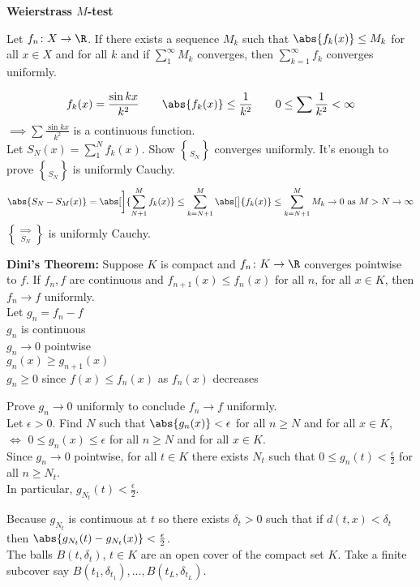 \cor \textbf{Weierstrass $M$-test}

Let $f_n\colon X\to\R$.  If there exists a sequence $M_k$ such that $\abs{f_k(x)}\leq M_k$ for all $x\in X$ and for all $k$ and if $\sum_1^\infty M_k$ converges, then $\sum_{k=1}^\infty f_k$ converges uniformly.

\ex
\[ f_k(x) = \frac{\sin kx}{k^2} \qquad \abs{f_k(x)}\leq\frac{1}{k^2} \qquad 0\leq\sum\frac{1}{k^2}<\infty \]
\negthickspace$\implies\sum\frac{\sin kx}{k^2}$ is a continuous function. \\
\pf Let $S_N(x)=\sum_1^N f_k(x)$.  Show $\brace{S_N}$ converges uniformly.  It's enough to prove $\brace{S_N}$ is uniformly Cauchy.
\[ \abs{S_N-S_M(x)} = \abs[\bigg]{\sum_{N+1}^M f_k(x)} \leq \sum_{k=N+1}^M\abs[\big]{f_k(x)} \leq \sum_{k=N+1}^M M_k \to0\text{ as }M>N\to\infty \]
\negthickspace$\implies\brace{S_N}$ is uniformly Cauchy.

\textbf{Dini's Theorem:} Suppose $K$ is compact and $f_n\colon K\to\R$ converges pointwise to $f$.  If $f_n,f$ are continuous and $f_{n+1}(x)\leq f_n(x)$ for all $n$, for all $x\in K$, then $f_n\to f$ uniformly. \\
\pf Let $g_n=f_n-f$ \\
$g_n$ is continuous \\
$g_n\to0$ pointwise \\
$g_n(x)\geq g_{n+1}(x)$ \\
$g_n\geq0$ since $f(x)\leq f_n(x)$ as $f_n(x)$ decreases

Prove $g_n\to0$ uniformly to conclude $f_n\to f$ uniformly. \\
Let $\epsilon>0$.  Find $N$ such that $\abs{g_n(x)}<\epsilon$ for all $n\geq N$ and for all $x\in K$, \\ $\iff$ $0\leq g_n(x)\leq\epsilon$ for all $n\geq N$ and for all $x\in K$. \\
Since $g_n\to0$ pointwise, for all $t\in K$ there exists $N_t$ such that $0\leq g_n(t)<\frac{\epsilon}{2}$ for all $n\geq N_t$. \\
In particular, $g_{N_t}(t)<\frac{\epsilon}{2}$.

Because $g_{N_t}$ is continuous at $t$ so there exists $\delta_t>0$ such that if $d(t,x)<\delta_t$ then $\abs{g_{N_t}(t)-g_{N_t}(x)}<\frac{\epsilon}{2}$. \\
The balls $B(t,\delta_t)$, $t\in K$ are an open cover of the compact set $K$.  Take a finite subcover say $B(t_1,\delta_{t_1}),\dotsc,B(t_L,\delta_{t_L})$.

